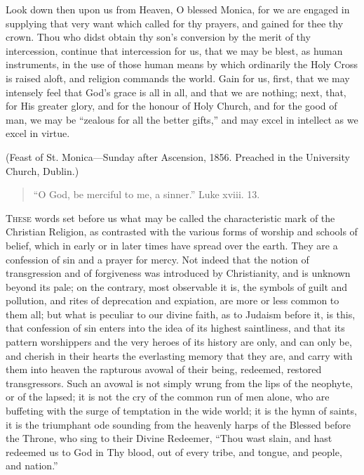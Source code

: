 Look down then upon us from Heaven, O blessed Monica,
for we are engaged in supplying that very want which
called for thy prayers, and gained for thee thy crown.
Thou who didst obtain thy son's conversion by the merit
of thy intercession, continue that intercession for us,
that we may be blest, as human instruments, in the use of
those human means by which ordinarily the Holy Cross is
raised aloft, and religion commands the world. Gain for
us, first, that we may intensely feel that God's grace is
all in all, and that we are nothing; next, that, for His
greater glory, and for the honour of Holy Church, and for
the good of man, we may be ``zealous for all the
better gifts,'' and may excel in intellect as we
excel in virtue.

(Feast of St. Monica—Sunday after Ascension, 1856.
Preached in the University Church, Dublin.)


\begin{quote}

``O God, be merciful to me, a sinner.''
Luke xviii. 13.

\end{quote}

T\textsc{hese} words set before us what may be called the
characteristic mark of the Christian Religion, as
contrasted with the various forms of worship and schools
of belief, which in early or in later times have spread
over the earth. They are a confession of sin and a prayer
for mercy. Not indeed that the notion of transgression
and of forgiveness was introduced by Christianity, and is
unknown beyond its pale; on the contrary, most observable
it is, the symbols of guilt and pollution, and rites of
deprecation and expiation, are more or less common to
them all; but what is peculiar to our divine faith, as to
Judaism before it, is this, that confession of sin enters
into the idea of its highest saintliness, and that its
pattern worshippers and the very heroes of its history
are only, and can only be, and cherish in their hearts
the everlasting memory that they are, and carry with them
into heaven the rapturous avowal of their being,
redeemed, restored transgressors. Such an avowal is not
simply wrung from the lips of the neophyte, or of the
lapsed; it is not the cry of the common run of men alone,
who are buffeting with the surge of temptation in the
wide world; it is the hymn of saints, it is the
triumphant ode sounding from the heavenly harps of the
Blessed before the Throne, who sing to their Divine
Redeemer, ``Thou wast slain, and hast redeemed us to
God in Thy blood, out of every tribe, and tongue, and
people, and nation.''

